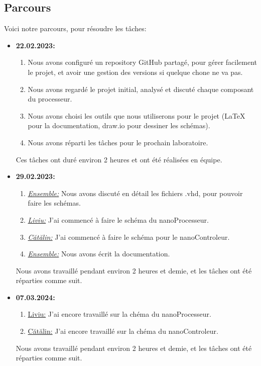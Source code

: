 \documentclass{article}
\begin{document}
    \subsection{Parcours}
    Voici notre parcours, pour résoudre les tâches:
    \begin{itemize}
        \item \textbf{22.02.2023:}
        \begin{enumerate}
            \item Nous avons configuré un repository GitHub partagé, pour gérer facilement le projet, et avoir une gestion des versions si quelque chone ne va pas.
            \item Nous avons regardé le projet initial, analysé et discuté chaque composant du processeur.
            \item Nous avons choisi les outils que nous utiliserons pour le projet (LaTeX pour la documentation, draw.io pour dessiner les schémas).
            \item Nous avons réparti les tâches pour le prochain laboratoire.
        \end{enumerate}
        Ces tâches ont duré environ 2 heures et ont été réalisées en équipe.
        \item \textbf{29.02.2023:}
        \begin{enumerate}
            \item \textit{\underline{Ensemble:}} Nous avons discuté en détail les fichiers .vhd, pour pouvoir faire les schémas.
            \item \textit{\underline{Liviu:}} J'ai commencé à faire le schéma du nanoProcesseur.
            \item \textit{\underline{Cătălin:}} J'ai commencé à faire le schéma pour le nanoControleur.
            \item \textit{\underline{Ensemble:}} Nous avons écrit la documentation.
        \end{enumerate}
        Nous avons travaillé pendant environ 2 heures et demie, et les tâches ont été réparties comme suit.
        \item \textbf{07.03.2024:}
        \begin{enumerate}
            \item \underline{Liviu:} J'ai encore travaillé sur la chéma du nanoProcesseur.
            \item \underline{Cătălin:} J'ai encore travaillé sur la chéma du nanoControleur.
        \end{enumerate}
        Nous avons travaillé pendant environ 2 heures et demie, et les tâches ont été réparties comme suit.

\end{itemize}
\end{document}
